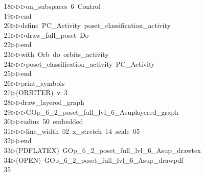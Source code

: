\begin{tabbing}
18\>$\triangleright$\>$\triangleright$\>$\triangleright$\>on\_subspaces\ 6\ Control\ \\[0pt]
19\>$\triangleright$\>$\triangleright$\>end\ \\[0pt]
20\>$\triangleright$\>$\triangleright$\>define\ PC\_Activity\ poset\_classification\_activity\ \\[0pt]
21\>$\triangleright$\>$\triangleright$\>$\triangleright$\>draw\_full\_poset\ Do\ \\[0pt]
22\>$\triangleright$\>$\triangleright$\>end\ \\[0pt]
23\>$\triangleright$\>$\triangleright$\>with\ Orb\ do\ orbits\_activity\ \\[0pt]
24\>$\triangleright$\>$\triangleright$\>$\triangleright$\>poset\_classification\_activity\ PC\_Activity\ \\[0pt]
25\>$\triangleright$\>$\triangleright$\>end\ \\[0pt]
26\>$\triangleright$\>$\triangleright$\>print\_symbols\\[0pt]
27\>$\triangleright$\>(ORBITER)\ v\ 3\ \\[0pt]
28\>$\triangleright$\>$\triangleright$\>draw\_layered\_graph\ \\[0pt]
29\>$\triangleright$\>$\triangleright$\>$\triangleright$\>GOp\_6\_2\_poset\_full\_lvl\_6\_Asuplayered\_graph\ \\[0pt]
30\>$\triangleright$\>$\triangleright$\>radius\ 50\ embedded\ \\[0pt]
31\>$\triangleright$\>$\triangleright$\>$\triangleright$\>line\_width\ 02\ x\_stretch\ 14\ scale\ 05\ \\[0pt]
32\>$\triangleright$\>$\triangleright$\>end\\[0pt]
33\>$\triangleright$\>(PDFLATEX)\ GOp\_6\_2\_poset\_full\_lvl\_6\_Asup\_drawtex\\[0pt]
34\>$\triangleright$\>(OPEN)\ GOp\_6\_2\_poset\_full\_lvl\_6\_Asup\_drawpdf\\[0pt]
35\>\end{tabbing}
